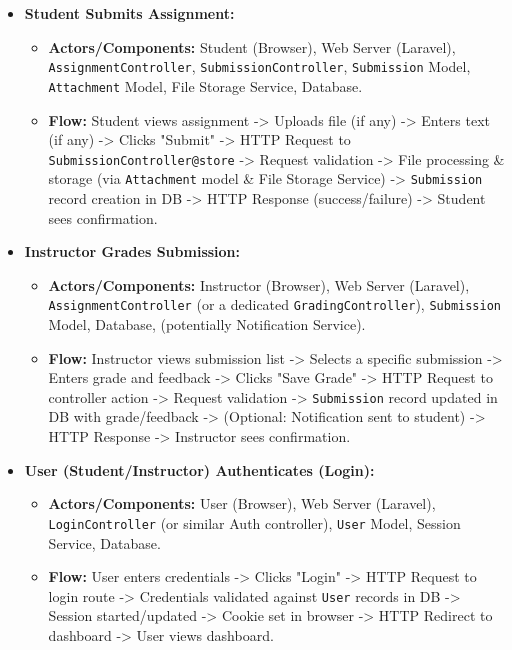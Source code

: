 \begin{itemize}
    \item \textbf{Student Submits Assignment:}
    \begin{itemize}
        \item \textbf{Actors/Components:} Student (Browser), Web Server (Laravel), \texttt{AssignmentController}, \texttt{SubmissionController}, \texttt{Submission} Model, \texttt{Attachment} Model, File Storage Service, Database.
        \item \textbf{Flow:} Student views assignment -> Uploads file (if any) -> Enters text (if any) -> Clicks "Submit" -> HTTP Request to \texttt{SubmissionController@store} -> Request validation -> File processing \& storage (via \texttt{Attachment} model \& File Storage Service) -> \texttt{Submission} record creation in DB -> HTTP Response (success/failure) -> Student sees confirmation.
    \end{itemize}
    \item \textbf{Instructor Grades Submission:}
    \begin{itemize}
        \item \textbf{Actors/Components:} Instructor (Browser), Web Server (Laravel), \texttt{AssignmentController} (or a dedicated \texttt{GradingController}), \texttt{Submission} Model, Database, (potentially Notification Service).
        \item \textbf{Flow:} Instructor views submission list -> Selects a specific submission -> Enters grade and feedback -> Clicks "Save Grade" -> HTTP Request to controller action -> Request validation -> \texttt{Submission} record updated in DB with grade/feedback -> (Optional: Notification sent to student) -> HTTP Response -> Instructor sees confirmation.
    \end{itemize}
    \item \textbf{User (Student/Instructor) Authenticates (Login):}
    \begin{itemize}
        \item \textbf{Actors/Components:} User (Browser), Web Server (Laravel), \texttt{LoginController} (or similar Auth controller), \texttt{User} Model, Session Service, Database.
        \item \textbf{Flow:} User enters credentials -> Clicks "Login" -> HTTP Request to login route -> Credentials validated against \texttt{User} records in DB -> Session started/updated -> Cookie set in browser -> HTTP Redirect to dashboard -> User views dashboard.
    \end{itemize}

\end{itemize}
